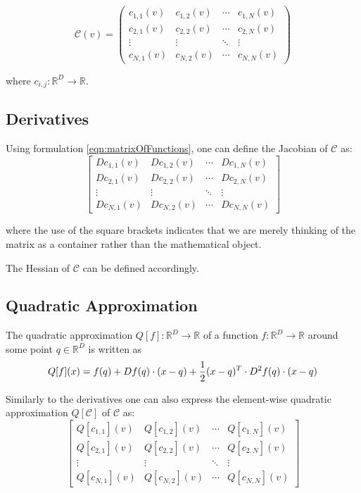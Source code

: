 \begin{equation}
\mathcal{C}(v) =  \begin{pmatrix}
  c_{1,1}(v) & c_{1,2}(v) & \cdots & c_{1,N}(v) \\
  c_{2,1}(v) & c_{2,2}(v) & \cdots & c_{2,N}(v) \\
  \vdots  & \vdots  & \ddots & \vdots  \\
  c_{N,1}(v) & c_{N,2}(v) & \cdots & c_{N,N}(v)
 \end{pmatrix}
 \label{eqn:matrixOfFunctions}
\end{equation}

where $c_{i,j} : \mathbb{R}^D \rightarrow \mathbb{R}$.

\subsection{Derivatives}
Using formulation \ref{eqn:matrixOfFunctions}, one can define the Jacobian of $\mathcal{C}$ as:
\begin{equation}
\begin{bmatrix}
  Dc_{1,1}(v) & Dc_{1,2}(v) & \cdots & Dc_{1,N}(v) \\
  Dc_{2,1}(v) & Dc_{2,2}(v) & \cdots & Dc_{2,N}(v) \\
  \vdots  & \vdots  & \ddots & \vdots  \\
  Dc_{N,1}(v) & Dc_{N,2}(v) & \cdots & Dc_{N,N}(v)
 \end{bmatrix}
 \label{eqn:matrixOfJacobians}
\end{equation}

where the use of the square brackets indicates that we are merely thinking of the matrix as a container rather than the mathematical object.

The Hessian of $\mathcal{C}$ can be defined accordingly.

\subsection{Quadratic Approximation}
The quadratic approximation $Q[f]: \mathbb{R}^D \rightarrow \mathbb{R}$ of a function $f: \mathbb{R}^D \rightarrow \mathbb{R}$ around some point $q \in \mathbb{R}^D$ is written as
\begin{equation}
Q[f](x) = f(q) + Df(q) \cdot (x-q) + {1 \over 2}(x-q)^T \cdot D^2f(q) \cdot (x-q)
\label{eqn:oneDimQuadratic}
\end{equation}

Similarly to the derivatives one can also express the element-wise quadratic approximation $Q[\mathcal{C}]$ of $\mathcal{C}$ as:
\begin{equation}
\begin{bmatrix}
  Q[c_{1,1}](v) & Q[c_{1,2}](v) & \cdots & Q[c_{1,N}](v) \\
  Q[c_{2,1}](v) & Q[c_{2,2}](v) & \cdots & Q[c_{2,N}](v) \\
  \vdots  & \vdots  & \ddots & \vdots  \\
  Q[c_{N,1}](v) & Q[c_{N,2}](v) & \cdots & Q[c_{N,N}](v)
 \end{bmatrix}
 \label{eqn:matrixOfQuadratics}
\end{equation}


